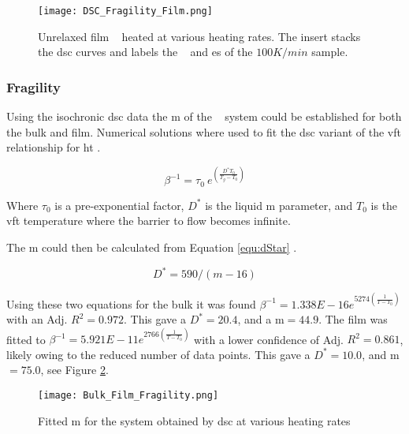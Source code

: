 \documentclass[a4paper,12pt,oneside]{article}%
\begin{document}
\begin{figure}[b]
	\centering
	\texttt{[image: DSC\_Fragility\_Film.png]}
	\caption[Table of contents Capition]{Unrelaxed film \MgZnCa~ heated at various heating rates. The insert stacks the \gls{dsc} curves and labels the \Tg~ and \Tx es of the $100 K/min$ sample.}%
	\label{fig:DSC_vHeatingRate_Film}
\end{figure}

\subsubsection{Fragility}

Using the isochronic \acrshort{dsc} data the \gls{m} of the \MgZnCa~ system could be established for both the bulk and film. Numerical solutions where used to fit the \acrshort{dsc} variant of the \gls{vft} relationship for \gls{ht} \cite{Busch1998}.

\begin{equation}
	\beta^{-1} = \tau_{0}~ e^{(\frac{D^{*}T_{0}}{T_{g}-T_{0}})}
	\label{equ:VFT}
\end{equation}

Where $\tau_{0}$ is a pre-exponential factor, $D^{*}$ is the liquid \acrlong{m} parameter, and $T_{0}$ is the \gls{vft} temperature where the barrier to flow becomes infinite.

The \gls{m} could then be calculated from Equation \ref{equ:dStar} \cite{Angell2002, Wei2014}.

\begin{equation}
	D^{*}=590/(m-16)
	\label{equ:dStar}
\end{equation}

Using these two equations for the bulk it was found $\beta^{-1} = 1.338E - 16e^{5274 (\frac{1}{T-T_{0}})}$ with an Adj. $R^{2}=0.972$. This gave a $D^{*}=20.4$, and a \gls{m}$=44.9$. The film was fitted to $\beta^{-1} = 5.921E - 11e^{2766 (\frac{1}{T-T_{0}})}$ with a lower confidence of Adj. $R^{2}=0.861$, likely owing to the reduced number of data points. This gave a $D^{*}=10.0$, and \gls{m}$=75.0$, see Figure \ref{fig:Fragility_BulkFilm_mValue}.

\begin{figure}[b]
	\centering
	\texttt{[image: Bulk\_Film\_Fragility.png]}
	\caption[Table of contents Capition]{Fitted \acrfull{m} for the \MgZnCa system obtained by \acrshort{dsc} at various heating rates}
	\label{fig:Fragility_BulkFilm_mValue}
\end{figure}
\end{document}
